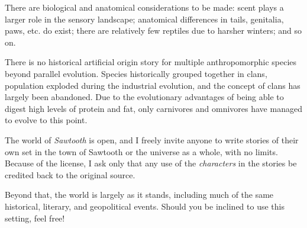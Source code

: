 There are biological and anatomical considerations to be made: scent plays a larger role in the sensory landscape; anatomical differences in tails, genitalia, paws, etc. do exist; there are relatively few reptiles due to harsher winters; and so on.

There is no historical artificial origin story for multiple anthropomorphic species beyond parallel evolution. Species historically grouped together in clans, population exploded during the industrial evolution, and the concept of clans has largely been abandoned. Due to the evolutionary advantages of being able to digest high levels of protein and fat, only carnivores and omnivores have managed to evolve to this point.

The world of \emph{Sawtooth} is open, and I freely invite anyone to write stories of their own set in the town of Sawtooth or the universe as a whole, with no limits. Because of the license, I ask only that any use of the \emph{characters} in the stories be credited back to the original source.

Beyond that, the world is largely as it stands, including much of the same historical, literary, and geopolitical events. Should you be inclined to use this setting, feel free!

\chapter*{}


